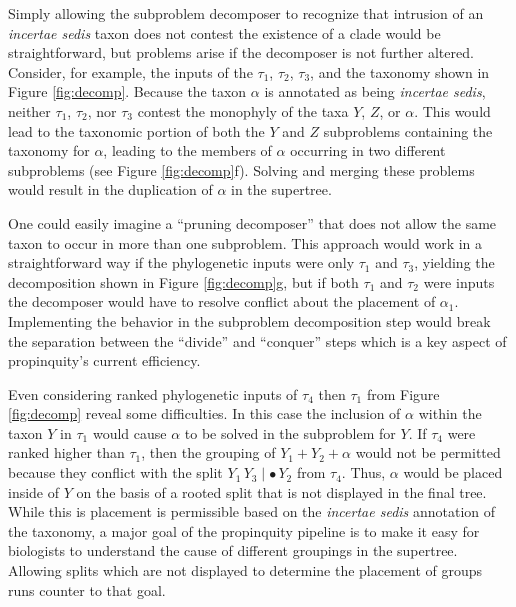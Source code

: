 \documentclass[english]{article}
\begin{document}
Simply allowing the subproblem decomposer to recognize that intrusion
    of an \emph{incertae sedis} taxon does not contest the existence
    of a clade would be straightforward, but problems arise if the
    decomposer is not further altered.
Consider, for example, the inputs of the $\tau_1$, $\tau_2$, $\tau_3$, and the taxonomy
    shown in Figure \ref{fig:decomp}.
Because the taxon $\alpha$ is annotated as being \emph{incertae sedis}, 
    neither  $\tau_1$, $\tau_2$, nor $\tau_3$ contest the monophyly of 
    the taxa $Y$, $Z$, or $\alpha$.
This would lead to the taxonomic portion of both the $Y$ and $Z$ subproblems
    containing the taxonomy for $\alpha$, leading to the members of
    $\alpha$ occurring in two different subproblems (see Figure \ref{fig:decomp}f).
Solving and merging these problems would result in the duplication of $\alpha$ 
    in the supertree.


One could easily
    imagine a ``pruning decomposer'' that does not allow the same taxon to
    occur in more than one subproblem.
This approach would work in a straightforward way if the phylogenetic inputs were only $\tau_1$ and $\tau_3$,
    yielding the decomposition shown in Figure \ref{fig:decomp}g, but if
    both $\tau_1$ and $\tau_2$ were inputs the decomposer would have to
    resolve conflict about the placement of $\alpha_1$.
Implementing the behavior in the subproblem decomposition step would
    break the separation between the ``divide'' and ``conquer'' steps
    which is a key aspect of propinquity's current efficiency.

Even considering ranked phylogenetic inputs of $\tau_4$ then $\tau_1$ from
    Figure \ref{fig:decomp} reveal some difficulties.
In this case the inclusion of $\alpha$ within the taxon $Y$ in $\tau_1$ would
    cause $\alpha$ to be solved in the subproblem for $Y$.
If $\tau_4$ were ranked higher than $\tau_1$, then the grouping of $Y_1+Y_2+\alpha$ would
    not be permitted because they conflict with the split $Y_1\,Y_3 \mid \bullet\,Y_2$ from
    $\tau_4$.
Thus, $\alpha$ would be placed inside of $Y$ on the basis of a rooted split
    that is not displayed in the final tree.
While this is placement is permissible based on the \emph{incertae sedis} annotation of the
    taxonomy, a major goal of the propinquity pipeline is to make it
    easy for biologists to understand the cause of different groupings in the 
    supertree.
Allowing splits which are not displayed to determine the placement of groups runs counter to that goal.
\end{document}
